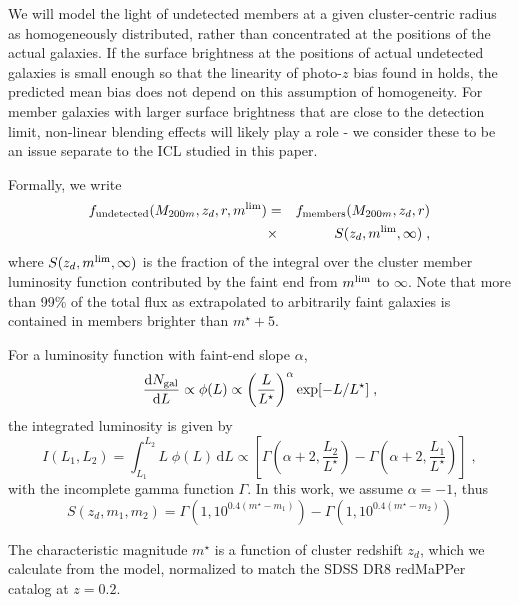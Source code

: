 {We will model the light of undetected members at a given cluster-centric radius as homogeneously distributed, rather than concentrated at the positions of the actual galaxies. If the surface brightness at the positions of actual undetected galaxies is small enough so that the linearity of photo-$z$ bias found in \citet{gruenicl} holds, the predicted mean bias does not depend on this assumption of homogeneity. For member galaxies with larger surface brightness that are close to the detection limit, non-linear blending effects will likely play a role - we consider these to be an issue separate to the ICL studied in this paper.

Formally, we write
\begin{eqnarray}
f_{\rm undetected}(M_{200m}, z_{d}, r, m^{\rm lim}) &=& f_{\rm members}(M_{200m}, z_{d}, r) \nonumber \\ &\times& S(z_d,m^{\rm lim},\infty) \; ,
\label{eqn:fundet}
\end{eqnarray}
where $S(z_d,m^{\rm lim},\infty)$ is the fraction of the integral over the cluster member luminosity function contributed by the faint end from $m^{\rm lim}$ to $\infty$. Note that more than 99\% of the total flux as extrapolated to arbitrarily faint galaxies is contained in members brighter than $m^{\star}+5$.

For a \citet{Schechter} luminosity function with faint-end slope $\alpha$,
\begin{equation}
\frac{\mathrm{d}N_{\rm gal}}{\mathrm{d}L}\propto\phi(L)\propto \left(\frac{L}{L^{\star}}\right)^{\alpha}\exp[-L/L^{\star}]\; ,
\end{equation}
the integrated luminosity is given by 
\begin{equation}
I(L_1,L_2)=\int_{L_1}^{L_2} L\;\phi(L)\,\mathrm{d}L \propto \left[\Gamma\left(\alpha+2,\frac{L_2}{L^{\star}}\right)-\Gamma\left(\alpha+2,\frac{L_1}{L^{\star}}\right)\right] \; ,
\end{equation}
with the incomplete gamma function $\Gamma$. In this work, we assume $\alpha=-1$, thus 
\begin{equation}
S(z_d,m_1,m_2)=\Gamma\left(1,10^{0.4(m^{\star}-m_1)}\right)-\Gamma\left(1,10^{0.4(m^{\star}-m_2)}\right)
\end{equation}

The characteristic magnitude $m^{\star}$ \citep{2007ApJ...660..221K, 2014ApJ...785..104R} is a function of cluster redshift $z_d$, which we calculate from the \citet{2003MNRAS.344.1000B} model, normalized to match the SDSS DR8 \citep{2011ApJS..193...29A} redMaPPer catalog \citep{2014ApJ...785..104R} at $z=0.2$.

}
